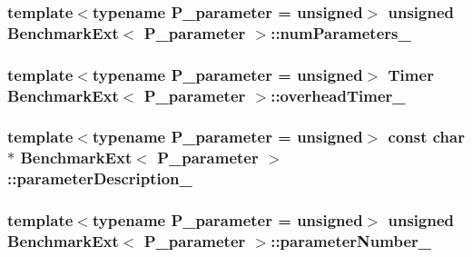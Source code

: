 \subsubsection[{num\+Parameters\+\_\+}]{\setlength{\rightskip}{0pt plus 5cm}template$<$typename P\+\_\+parameter  = unsigned$>$ unsigned {\bf Benchmark\+Ext}$<$ P\+\_\+parameter $>$\+::num\+Parameters\+\_\+\hspace{0.3cm}{\ttfamily [protected]}}\label{classBenchmarkExt_aa8504a4be8de5aa135895c34efbb15c0}
\hypertarget{classBenchmarkExt_a2e1215f0dfeceea6fdcbf8908a9a3b8b}{}
\subsubsection[{overhead\+Timer\+\_\+}]{\setlength{\rightskip}{0pt plus 5cm}template$<$typename P\+\_\+parameter  = unsigned$>$ {\bf Timer} {\bf Benchmark\+Ext}$<$ P\+\_\+parameter $>$\+::overhead\+Timer\+\_\+\hspace{0.3cm}{\ttfamily [protected]}}\label{classBenchmarkExt_a2e1215f0dfeceea6fdcbf8908a9a3b8b}
\hypertarget{classBenchmarkExt_ae1c3dfaa3c0ca464100a01e01d2dff1c}{}
\subsubsection[{parameter\+Description\+\_\+}]{\setlength{\rightskip}{0pt plus 5cm}template$<$typename P\+\_\+parameter  = unsigned$>$ const char$\ast$ {\bf Benchmark\+Ext}$<$ P\+\_\+parameter $>$\+::parameter\+Description\+\_\+\hspace{0.3cm}{\ttfamily [protected]}}\label{classBenchmarkExt_ae1c3dfaa3c0ca464100a01e01d2dff1c}
\hypertarget{classBenchmarkExt_a02f860acfdd29c1d2874996d3d187dad}{}
\subsubsection[{parameter\+Number\+\_\+}]{\setlength{\rightskip}{0pt plus 5cm}template$<$typename P\+\_\+parameter  = unsigned$>$ unsigned {\bf Benchmark\+Ext}$<$ P\+\_\+parameter $>$\+::parameter\+Number\+\_\+\hspace{0.3cm}{\ttfamily [protected]}}\label{classBenchmarkExt_a02f860acfdd29c1d2874996d3d187dad}
\hypertarget{classBenchmarkExt_a227f3a8ff41b5c86c40aa8b9c6cf7402}{}
